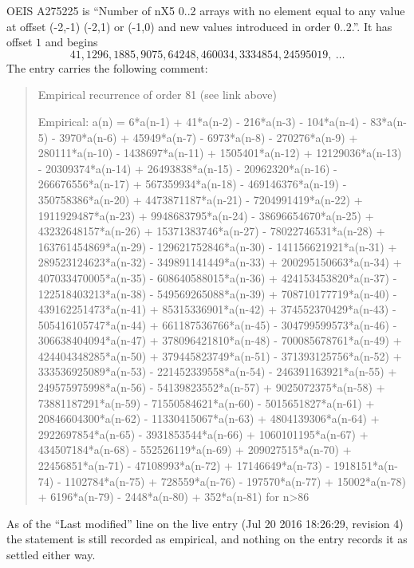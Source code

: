 \documentclass[11pt,a4paper]{article}
\theoremstyle{plain}
\theoremstyle{definition}
\begin{document}
OEIS A275225 is ``Number of nX5 0..2 arrays with no element equal to any value at offset (-2,-1) (-2,1) or (-1,0) and new values introduced in order 0..2.''. It has offset $1$ and begins
\[
41, 1296, 1885, 9075, 64248, 460034, 3334854, 24595019,\ \dots
\]
The entry carries the following comment:
\begin{quote}\small
Empirical recurrence of order 81 (see link above)

Empirical: a(n) = 6*a(n-1) + 41*a(n-2) - 216*a(n-3) - 104*a(n-4) - 83*a(n-5) - 3970*a(n-6) + 45949*a(n-7) - 6973*a(n-8) - 270276*a(n-9) + 280111*a(n-10) - 1438697*a(n-11) + 1505401*a(n-12) + 12129036*a(n-13) - 20309374*a(n-14) + 26493838*a(n-15) - 20962320*a(n-16) - 266676556*a(n-17) + 567359934*a(n-18) - 469146376*a(n-19) - 350758386*a(n-20) + 4473871187*a(n-21) - 7204991419*a(n-22) + 1911929487*a(n-23) + 9948683795*a(n-24) - 38696654670*a(n-25) + 43232648157*a(n-26) + 15371383746*a(n-27) - 78022746531*a(n-28) + 163761454869*a(n-29) - 129621752846*a(n-30) - 141156621921*a(n-31) + 289523124623*a(n-32) - 349891141449*a(n-33) + 200295150663*a(n-34) + 407033470005*a(n-35) - 608640588015*a(n-36) + 424153453820*a(n-37) - 122518403213*a(n-38) - 549569265088*a(n-39) + 708710177719*a(n-40) - 439162251473*a(n-41) + 85315336901*a(n-42) + 374552370429*a(n-43) - 505416105747*a(n-44) + 661187536766*a(n-45) - 304799599573*a(n-46) - 306638404094*a(n-47) + 378096421810*a(n-48) - 700085678761*a(n-49) + 424404348285*a(n-50) + 379445823749*a(n-51) - 371393125756*a(n-52) + 333536925089*a(n-53) - 221452339558*a(n-54) - 246391163921*a(n-55) + 249575975998*a(n-56) - 54139823552*a(n-57) + 9025072375*a(n-58) + 73881187291*a(n-59) - 71550584621*a(n-60) - 5015651827*a(n-61) + 20846604300*a(n-62) - 11330415067*a(n-63) + 4804139306*a(n-64) + 2922697854*a(n-65) - 3931853544*a(n-66) + 1060101195*a(n-67) + 434507184*a(n-68) - 552526119*a(n-69) + 209027515*a(n-70) + 22456851*a(n-71) - 47108993*a(n-72) + 17146649*a(n-73) - 1918151*a(n-74) - 1102784*a(n-75) + 728559*a(n-76) - 197570*a(n-77) + 15002*a(n-78) + 6196*a(n-79) - 2448*a(n-80) + 352*a(n-81) for n>86
\end{quote}
As of the ``Last modified'' line on the live entry (Jul 20 2016 18:26:29, revision 4) the statement is
still recorded as empirical, and nothing on the entry records it as settled either way.
\end{document}
